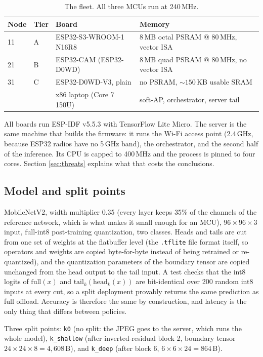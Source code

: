 \documentclass[11pt,a4paper]{article}
\begin{document}
\begin{table}[h]
\centering
\begin{tabular}{llll}
\toprule
Node & Tier & Board & Memory \\
\midrule
11 & A & ESP32-S3-WROOM-1 N16R8 & 8\,MB octal PSRAM @ 80\,MHz, vector ISA \\
21 & B & ESP32-CAM (ESP32-D0WD)  & 8\,MB quad PSRAM @ 80\,MHz, no vector ISA \\
31 & C & ESP32-D0WD-V3, plain    & no PSRAM, ${\sim}150$\,KB usable SRAM \\
\midrule
   &   & x86 laptop (Core 7 150U) & soft-AP, orchestrator, server tail \\
\bottomrule
\end{tabular}
\caption{The fleet. All three MCUs run at 240\,MHz.}
\end{table}

All boards run ESP-IDF v5.5.3 with TensorFlow Lite Micro. The server is the same
machine that builds the firmware: it runs the Wi-Fi access point (2.4\,GHz,
because ESP32 radios have no 5\,GHz band), the orchestrator, and the second half
of the inference. Its CPU is capped to 400\,MHz and the process is pinned to
four cores. Section \ref{sec:threats} explains what that costs the conclusions.

\subsection{Model and split points}

MobileNetV2, width multiplier 0.35 (every layer keeps 35\% of the channels of
the reference network, which is what makes it small enough for an MCU),
$96\times96\times3$ input, full-int8 post-training quantization, two classes.
Heads and tails are cut from one set of weights at the flatbuffer level (the
\texttt{.tflite} file format itself, so operators and weights are copied
byte-for-byte instead of being retrained or re-quantized), and the quantization
parameters of the boundary tensor are copied unchanged from the head output to
the tail input. A test checks that the int8 logits of $\mathrm{full}(x)$ and
$\mathrm{tail}_k(\mathrm{head}_k(x))$ are bit-identical over 200 random int8
inputs at every cut, so a split deployment provably returns the same prediction
as full offload. Accuracy is therefore the same by construction, and latency is
the only thing that differs between policies.

Three split points: \texttt{k0} (no split: the JPEG goes to the server, which
runs the whole model), \texttt{k\_shallow} (after inverted-residual block 2,
boundary tensor $24\times24\times8 = 4{,}608$\,B), and \texttt{k\_deep} (after
block 6, $6\times6\times24 = 864$\,B).
\end{document}
